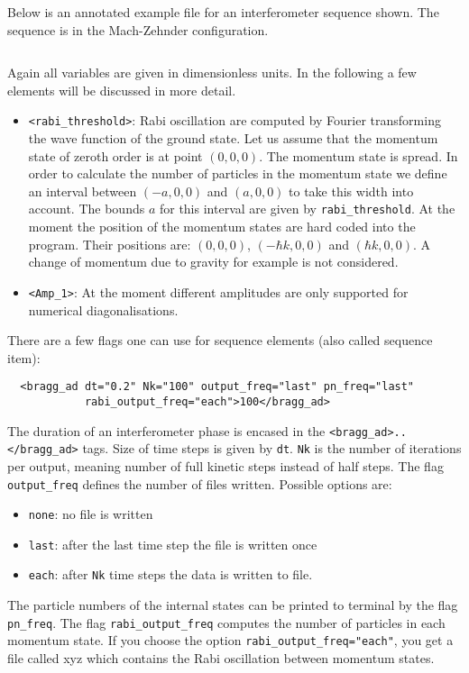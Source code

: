 \documentclass[12pt]{article}
\begin{document}
Below is an annotated example file for an interferometer sequence shown. 
The sequence is in the Mach-Zehnder configuration.
\inputminted{xml}{bragg_ad.xml} \noindent 
Again all variables are given in dimensionless units. 
In the following a few elements will be discussed in more detail.
\begin{itemize}
  \item \texttt{<rabi_threshold>}: Rabi oscillation are computed
    by Fourier transforming the wave function of the ground state. Let us assume
    that the momentum state of zeroth order is at point $(0,0,0)$. 
    The momentum state is spread. In order to calculate the number of particles
    in the momentum state we define an interval between $(-a,0,0)$ 
    and $(a,0,0)$ to take this width into account.
    The bounds $a$ for this interval are given by \texttt{rabi_threshold}.
    At the moment the position of the momentum states are hard coded into the
    program. Their positions are: $(0,0,0)$, $(-\hbar k,0,0)$ and $(\hbar k,0,0)$.
    A change of momentum due to gravity for example is not considered. 
  \item \texttt{<Amp_1>}: At the moment different amplitudes 
    are only supported for numerical diagonalisations.
\end{itemize}
There are a few flags one can use for sequence elements (also called sequence item):
\begin{verbatim}
  <bragg_ad dt="0.2" Nk="100" output_freq="last" pn_freq="last" 
            rabi_output_freq="each">100</bragg_ad>
\end{verbatim}
The duration of an interferometer phase is encased in the 
\texttt{<bragg_ad>..</bragg_ad>} tags.
Size of time steps is given by \texttt{dt}. \texttt{Nk} 
is the number of iterations per output, meaning number of full kinetic steps 
instead of half steps. The flag \texttt{output_freq} defines the number of 
files written. Possible options are:
\begin{itemize}
  \item \texttt{none}: no file is written
  \item \texttt{last}: after the last time step the file is written once
  \item \texttt{each}: after \texttt{Nk} time steps the data is written
    to file.
\end{itemize}
The particle numbers of the internal states can be printed to terminal
by the flag \texttt{pn_freq}. The flag \texttt{rabi_output_freq}
computes the number of particles in each momentum state. If you choose the option
\texttt{rabi_output_freq="each"}, you get a file called xyz which contains
the Rabi oscillation between momentum states.
\end{document}
